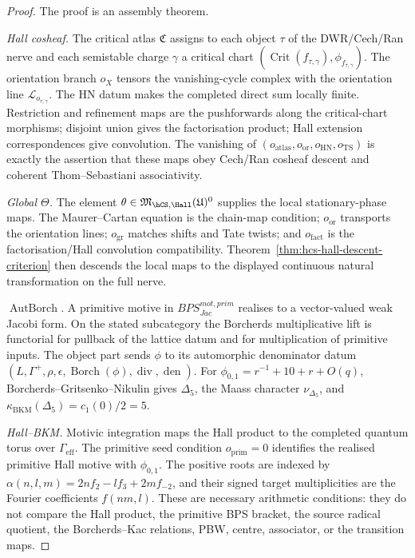 \begin{proof}
The proof is an assembly theorem.

\emph{Hall cosheaf.} The critical atlas \(\mathfrak C\) assigns to
each object \(\tau\) of the DWR/Cech/Ran nerve and each semistable
charge \(\gamma\) a critical chart
\((\operatorname{Crit}(f_{\tau,\gamma}),\phi_{f_{\tau,\gamma}})\). The
orientation branch \(o_X\) tensors the vanishing-cycle complex with the
orientation line \(\mathscr L_{o_{\tau,\gamma}}\). The HN datum makes
the completed direct sum locally finite. Restriction and refinement
maps are the pushforwards along the critical-chart morphisms; disjoint
union gives the factorisation product; Hall extension correspondences
give convolution. The vanishing of
\((o_{\mathrm{atlas}},o_{\mathrm{or}},o_{\mathrm{HN}},o_{\mathrm{TS}})\)
is exactly the assertion that these maps obey Cech/Ran cosheaf descent
and coherent Thom--Sebastiani associativity.

\emph{Global \(\Theta\).} The element \(\theta\in
\mathfrak M_{\hCS,\Hall}(\mathfrak U)^0\) supplies the local
stationary-phase maps. The Maurer--Cartan equation is the chain-map
condition; \(o_{\mathrm{or}}\) transports the orientation lines;
\(o_{\mathrm{gr}}\) matches shifts and Tate twists; and
\(o_{\mathrm{fact}}\) is the factorisation/Hall convolution
compatibility. Theorem~\ref{thm:hcs-hall-descent-criterion} then
descends the local maps to the displayed continuous natural
transformation on the full nerve.

\emph{\(\operatorname{AutBorch}\).} A primitive motive in
\(BPS^{mot,prim}_{Jac}\) realises to a vector-valued weak Jacobi form.
On the stated subcategory the Borcherds multiplicative lift is
functorial for pullback of the lattice datum and for multiplication of
primitive inputs. The object part sends \(\phi\) to its automorphic
denominator datum
\((L,\Gamma^+,\rho,\epsilon,\operatorname{Borch}(\phi),
\operatorname{div},\operatorname{den})\). For
\(\phi_{0,1}=r^{-1}+10+r+O(q)\), Borcherds--Gritsenko--Nikulin gives
\(\Delta_5\), the Maass character \(\nu_{\Delta_5}\), and
\(\kappa_{\mathrm{BKM}}(\Delta_5)=c_1(0)/2=5\).

\emph{Hall--BKM.} Motivic integration maps the Hall product to the
completed quantum torus over \(\Gamma_{\mathrm{eff}}\). The primitive
seed condition \(o_{\mathrm{prim}}=0\) identifies the realised primitive
Hall motive with \(\phi_{0,1}\). The positive roots are indexed by
\(\alpha(n,l,m)=2nf_2-lf_3+2mf_{-2}\), and their signed target
multiplicities are the Fourier coefficients \(f(nm,l)\). These are
necessary arithmetic conditions: they do not compare the Hall product, the
primitive BPS bracket, the source radical quotient, the Borcherds--Kac
relations, PBW, centre, associator, or the transition maps.


\end{proof}
